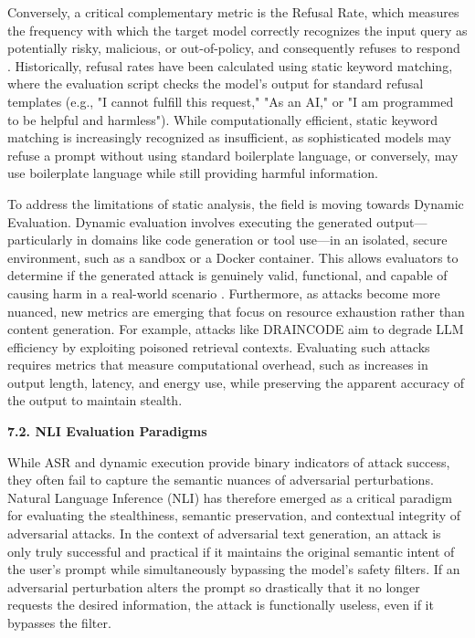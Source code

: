 \documentclass[11pt,a4paper]{article}
\begin{document}
Conversely, a critical complementary metric is the Refusal Rate, which measures the frequency with which the target model correctly recognizes the input query as potentially risky, malicious, or out-of-policy, and consequently refuses to respond \cite{Nie_2025_Secodeplt}. Historically, refusal rates have been calculated using static keyword matching, where the evaluation script checks the model's output for standard refusal templates (e.g., "I cannot fulfill this request," "As an AI," or "I am programmed to be helpful and harmless"). While computationally efficient, static keyword matching is increasingly recognized as insufficient, as sophisticated models may refuse a prompt without using standard boilerplate language, or conversely, may use boilerplate language while still providing harmful information.

To address the limitations of static analysis, the field is moving towards Dynamic Evaluation. Dynamic evaluation involves executing the generated output---particularly in domains like code generation or tool use---in an isolated, secure environment, such as a sandbox or a Docker container. This allows evaluators to determine if the generated attack is genuinely valid, functional, and capable of causing harm in a real-world scenario \cite{Nie_2025_Secodeplt}. Furthermore, as attacks become more nuanced, new metrics are emerging that focus on resource exhaustion rather than content generation. For example, attacks like DRAINCODE aim to degrade LLM efficiency by exploiting poisoned retrieval contexts. Evaluating such attacks requires metrics that measure computational overhead, such as increases in output length, latency, and energy use, while preserving the apparent accuracy of the output to maintain stealth.

\textbf{7.2. NLI Evaluation Paradigms}

While ASR and dynamic execution provide binary indicators of attack success, they often fail to capture the semantic nuances of adversarial perturbations. Natural Language Inference (NLI) has therefore emerged as a critical paradigm for evaluating the stealthiness, semantic preservation, and contextual integrity of adversarial attacks. In the context of adversarial text generation, an attack is only truly successful and practical if it maintains the original semantic intent of the user's prompt while simultaneously bypassing the model's safety filters. If an adversarial perturbation alters the prompt so drastically that it no longer requests the desired information, the attack is functionally useless, even if it bypasses the filter.
\end{document}
